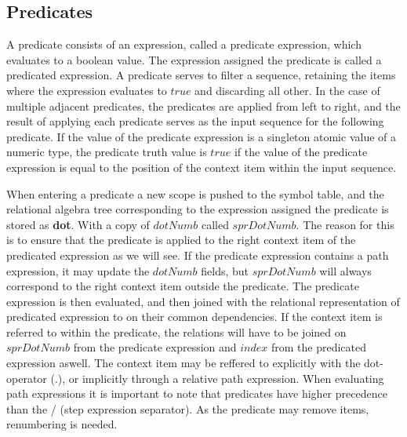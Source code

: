 \subsection{Predicates}
\label{sect:trans:TD:predicates}
A predicate consists of an expression, called a predicate expression, which evaluates to a boolean value. The
expression assigned the predicate is called a predicated expression. A predicate serves to filter a sequence,
retaining the items where the expression evaluates to $true$ and discarding all other. In the case of multiple
adjacent predicates, the predicates are applied from left to right, and the result of applying each predicate
serves as the input sequence for the following predicate. If the value of the predicate expression is a singleton
atomic value of a numeric type, the predicate truth value is $true$ if the value of the predicate expression is
equal to the position of the context item within the input sequence.

When entering a predicate a new scope is pushed to the symbol table, and the relational algebra tree corresponding
to the expression assigned the predicate is stored as \textbf{dot}. With a copy of $dotNumb$ called $sprDotNumb$.
The reason for this is to ensure that the predicate is applied to the right context item of the predicated
expression as we will see. If the predicate expression contains a path expression, it may update the $dotNumb$
fields, but $sprDotNumb$ will always correspond to the right context item outside the predicate. The predicate
expression is then evaluated, and then joined with the relational representation of predicated expression to on
their common dependencies. If the context item is referred to within the predicate, the relations will have to be
joined on $sprDotNumb$ from the predicate expression and $index$ from the predicated expression aswell. The
context item may be reffered to explicitly with the dot-operator (.), or implicitly through a relative path
expression. When evaluating path expressions it is important to note that predicates have higher precedence than
the / (step expression separator). As the predicate may remove items, renumbering is needed.

